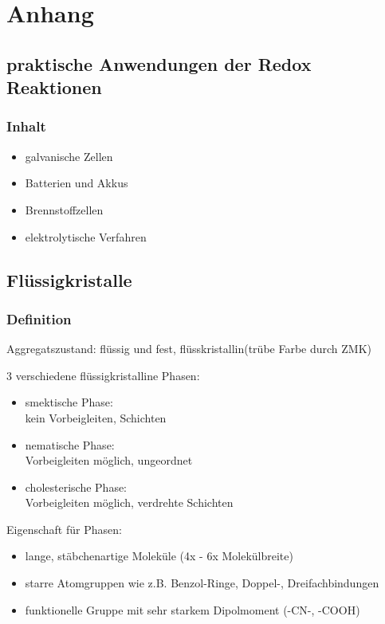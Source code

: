 \section{Anhang}

\subsection{praktische Anwendungen der Redox Reaktionen}

\subsubsection{Inhalt} %
\begin{itemize}
	\item galvanische Zellen
	\item  Batterien und Akkus
	\item  Brennstoffzellen
	\item  elektrolytische Verfahren
	

\end{itemize}

\subsection{Flüssigkristalle}

\subsubsection{Definition}
\begin{center}
	Aggregatszustand: flüssig und fest, flüsskristallin(trübe Farbe durch ZMK)
\end{center}
\begin{minipage}{0.48\linewidth}
	3 verschiedene flüssigkristalline Phasen:
	\begin{itemize}
  	  \item smektische Phase: \\
 	   	     kein Vorbeigleiten, Schichten
  	  \item nematische Phase: \\
  	  	     Vorbeigleiten möglich, ungeordnet
 	   \item cholesterische Phase: \\
	    	     Vorbeigleiten möglich, verdrehte Schichten
	\end{itemize}
	\hfill
\end{minipage}	
\begin{minipage}{0.48\linewidth}
	Eigenschaft für Phasen:
	\begin{itemize}
	    \item lange, stäbchenartige Moleküle (4x - 6x Molekülbreite)
	    \item starre Atomgruppen wie z.B. Benzol-Ringe, Doppel-, Dreifachbindungen
	    \item funktionelle Gruppe mit sehr starkem Dipolmoment (-CN-, -COOH)
	\end{itemize}
\end{minipage}




